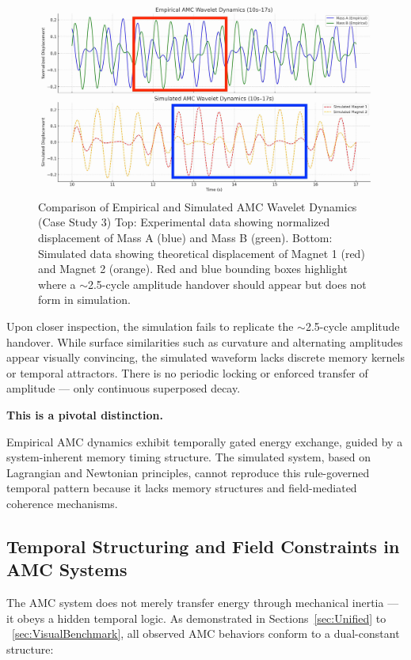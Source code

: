\documentclass[10pt,aps,pre,onecolumn,superscriptaddress,notitlepage]{revtex4-2}
\begin{document}
\begin{figure}[h]
  \centering
  \includegraphics[width=0.8\linewidth]{figures/Figure_5H_CaseStudy3_Empirical_vs_Simulation_Split 3.jpg}
  \caption{Comparison of Empirical and Simulated AMC Wavelet Dynamics (Case Study 3)
 Top: Experimental data showing normalized displacement of Mass A (blue) and Mass B (green). Bottom: Simulated data showing theoretical displacement of Magnet 1 (red) and Magnet 2 (orange). Red and blue bounding boxes highlight where a $\sim$2.5-cycle amplitude handover should appear but does not form in simulation.}
  \label{fig:empvsim}
\end{figure}
Upon closer inspection, the simulation fails to replicate the $\sim$2.5-cycle amplitude handover. While surface similarities such as curvature and alternating amplitudes appear visually convincing, the simulated waveform lacks discrete memory kernels or temporal attractors. There is no periodic locking or enforced transfer of amplitude — only continuous superposed decay.

\textbf{This is a pivotal distinction.}

Empirical AMC dynamics exhibit temporally gated energy exchange, guided by a system-inherent memory timing structure. The simulated system, based on Lagrangian and Newtonian principles, cannot reproduce this rule-governed temporal pattern because it lacks memory structures and field-mediated coherence mechanisms.
\clearpage
\subsection{Temporal Structuring and Field Constraints in AMC Systems}
\label{sec:TemporalStructuringandFieldConstraints}
The AMC system does not merely transfer energy through mechanical inertia — it obeys a hidden temporal logic. As demonstrated in Sections~\ref{sec:Unified} to ~\ref{sec:VisualBenchmark}, all observed AMC behaviors conform to a dual-constant structure:
\end{document}
